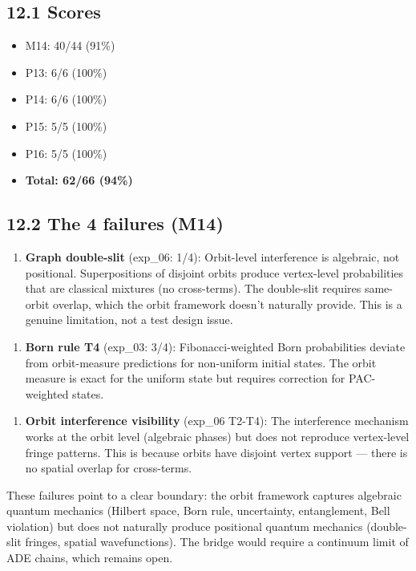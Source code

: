 \documentclass[11pt,a4paper]{article}
\providecommand{\tightlist}{\setlength{\itemsep}{0pt}\setlength{\parskip}{0pt}}
\begin{document}
\subsection*{12.1 Scores}

\begin{itemize}\tightlist
\item M14: 40/44 (91\%)
\item P13: 6/6 (100\%)
\item P14: 6/6 (100\%)
\item P15: 5/5 (100\%)
\item P16: 5/5 (100\%)
\item \textbf{Total: 62/66 (94\%)}
\end{itemize}

\subsection*{12.2 The 4 failures (M14)}

\begin{enumerate}\tightlist
\item \textbf{Graph double-slit} (exp\_06: 1/4): Orbit-level interference is algebraic, not positional. Superpositions of disjoint orbits produce vertex-level probabilities that are classical mixtures (no cross-terms). The double-slit requires same-orbit overlap, which the orbit framework doesn't naturally provide. This is a genuine limitation, not a test design issue.
\end{enumerate}

\begin{enumerate}\tightlist
\item \textbf{Born rule T4} (exp\_03: 3/4): Fibonacci-weighted Born probabilities deviate from orbit-measure predictions for non-uniform initial states. The orbit measure is exact for the uniform state but requires correction for PAC-weighted states.
\end{enumerate}

\begin{enumerate}\tightlist
\item \textbf{Orbit interference visibility} (exp\_06 T2-T4): The interference mechanism works at the orbit level (algebraic phases) but does not reproduce vertex-level fringe patterns. This is because orbits have disjoint vertex support — there is no spatial overlap for cross-terms.
\end{enumerate}

These failures point to a clear boundary: the orbit framework captures algebraic quantum mechanics (Hilbert space, Born rule, uncertainty, entanglement, Bell violation) but does not naturally produce positional quantum mechanics (double-slit fringes, spatial wavefunctions). The bridge would require a continuum limit of ADE chains, which remains open.
\end{document}

